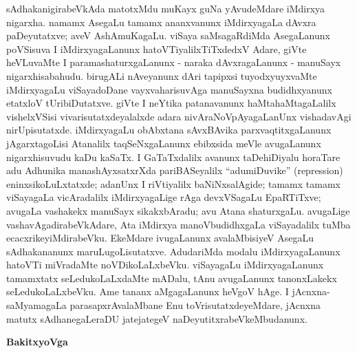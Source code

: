 sAdhakanigirabeVkAda matotxMdu muKayx guNa yAvudeMdare iMdirxya nigarxha. namamx AsegaLu tamamx ananxvanunx iMdirxyagaLa dAvxra paDeyutatxve; aveV AshAmuKagaLu. viSaya saMsagaRdiMda AsegaLanunx poVSisuva I iMdirxyagaLanunx hatoVTiyalilx\-TiTxdedxV Adare, giVte heVLuvaMte I paramashaturxgaLanunx - naraka dAvxragaLanunx - manuSayx nigarxhisabahudu. birugALi nAveyanunx dAri tapipxsi tuyodxyuyxvaMte iMdirxya\-gaLu viSayadoDane vayxvaharisuvAga manuSayxna budidhxyanunx etatxloV tUribiDutatxve. giVte I neYtika patanavanunx haMtahaMtagaLalilx vishelxVSisi vivarisutatxdeyalalxde adara nivAraNoV\-pAyagaLanUnx vishadavAgi nirUpisutatxde. iMdirxyagaLu obAbxtana sAvxBAvika  parxvaqtitxgaLanunx jAgarxtagoLisi Atanalilx taqSeNxgaLanunx ebibxsida meVle avugaLanunx nigarxhisu\-vudu kaDu kaSaTx. I GaTaTxdalilx avanunx taDehiDiyalu horaTare adu Adhunika mana\-shAyxsatxrXda pariBASeyalilx ``adumiDuvike'' {\rm (repression)} eninxsikoLuLxtatxde; \hbox{adanUnx} I riVtiyalilx baNiNxsalAgide; tamamx tamamx viSayagaLa vicAradalilx iMdirxyagaLige rAga devxVSagaLu EpaRTiTxve; avugaLa vashakekx manuSayx sikakxbAradu; avu Atana shaturxgaLu. avugaLige vashavAgadirabeVkAdare, Ata iMdirxya manoVbudidhxgaLa viSayadalilx tuMba ecacxrikeyiMdirabeVku. EkeMdare ivugaLanunx avalaMbisiyeV AsegaLu sAdhakananunx maruLugoLisutatxve. AdudariMda modalu iMdirxyagaLanunx hatoVTi miVradaMte noVDikoLaLxbeVku. viSayagaLu iMdirxyagaLanunx tamamxtatx seLedukoLaLxdaMte mADalu, tAnu avugaLanunx tanonxLakekx seLedukoLaLxbeVku. Ame tananx aMgagaLanunx heVgoV hAge. I jAcnxna-saMyamagaLa parasapxrAvalaMbane Enu toVrisutatxdeyeMdare, jAcnxna matutx sAdhanegaLeraDU jatejategeV naDeyutitxrabeVkeMbudanunx.

\begin{center}
\textbf{\Large{BakitxyoVga}}
\end{center}

